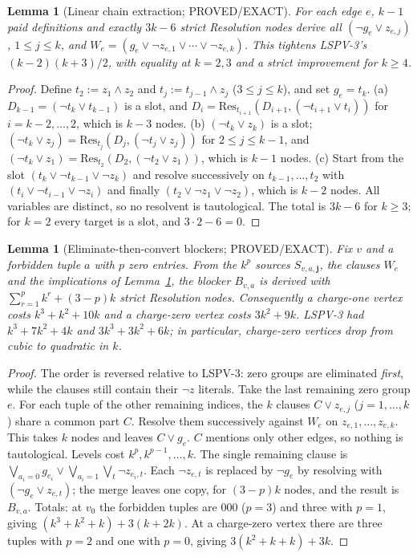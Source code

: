 \documentclass[11pt]{article}
\newtheorem{lemma}[theorem]{Lemma}
\begin{document}
\begin{lemma}[Linear chain extraction; PROVED/EXACT]\label{lem:chain}
For each edge $e$, $k-1$ paid definitions and exactly $3k-6$ strict Resolution nodes derive all $(\neg g_e\vee z_{e,j})$, $1\le j\le k$, and $W_e=(g_e\vee\neg z_{e,1}\vee\cdots\vee\neg z_{e,k})$. This tightens LSPV-3's $(k-2)(k+3)/2$, with equality at $k=2,3$ and a strict improvement for $k\ge4$.
\end{lemma}
\begin{proof}
Define $t_2:=z_1\wedge z_2$ and $t_j:=t_{j-1}\wedge z_j$ ($3\le j\le k$), and set $g_e=t_k$. (a) $D_{k-1}=(\neg t_k\vee t_{k-1})$ is a slot, and $D_i=\mathrm{Res}_{t_{i+1}}(D_{i+1},(\neg t_{i+1}\vee t_i))$ for $i=k-2,\ldots,2$, which is $k-3$ nodes. (b) $(\neg t_k\vee z_k)$ is a slot; $(\neg t_k\vee z_j)=\mathrm{Res}_{t_j}(D_j,(\neg t_j\vee z_j))$ for $2\le j\le k-1$, and $(\neg t_k\vee z_1)=\mathrm{Res}_{t_2}(D_2,(\neg t_2\vee z_1))$, which is $k-1$ nodes. (c) Start from the slot $(t_k\vee\neg t_{k-1}\vee\neg z_k)$ and resolve successively on $t_{k-1},\ldots,t_2$ with $(t_i\vee\neg t_{i-1}\vee\neg z_i)$ and finally $(t_2\vee\neg z_1\vee\neg z_2)$, which is $k-2$ nodes. All variables are distinct, so no resolvent is tautological. The total is $3k-6$ for $k\ge3$; for $k=2$ every target is a slot, and $3\cdot2-6=0$.
\end{proof}

\begin{lemma}[Eliminate-then-convert blockers; PROVED/EXACT]\label{lem:block}
Fix $v$ and a forbidden tuple $a$ with $p$ zero entries. From the $k^p$ sources $S_{v,a,\mathbf j}$, the clauses $W_e$ and the implications of Lemma~\ref{lem:chain}, the blocker $B_{v,a}$ is derived with $\sum_{r=1}^{p}k^r+(3-p)k$ strict Resolution nodes. Consequently a charge-one vertex costs $k^3+k^2+10k$ and a charge-zero vertex costs $3k^2+9k$. LSPV-3 had $k^3+7k^2+4k$ and $3k^3+3k^2+6k$; in particular, charge-zero vertices drop from cubic to quadratic in $k$.
\end{lemma}
\begin{proof}
The order is reversed relative to LSPV-3: zero groups are eliminated \emph{first}, while the clauses still contain their $\neg z$ literals. Take the last remaining zero group $e$. For each tuple of the other remaining indices, the $k$ clauses $C\vee z_{e,j}$ ($j=1,\ldots,k$) share a common part $C$. Resolve them successively against $W_e$ on $z_{e,1},\ldots,z_{e,k}$. This takes $k$ nodes and leaves $C\vee g_e$. $C$ mentions only other edges, so nothing is tautological. Levels cost $k^p,k^{p-1},\ldots,k$. The single remaining clause is $\bigvee_{a_i=0}g_{e_i}\vee\bigvee_{a_i=1}\bigvee_t\neg z_{e_i,t}$. Each $\neg z_{e,t}$ is replaced by $\neg g_e$ by resolving with $(\neg g_e\vee z_{e,t})$; the merge leaves one copy, for $(3-p)k$ nodes, and the result is $B_{v,a}$. Totals: at $v_0$ the forbidden tuples are $000$ ($p=3$) and three with $p=1$, giving $(k^3+k^2+k)+3(k+2k)$. At a charge-zero vertex there are three tuples with $p=2$ and one with $p=0$, giving $3(k^2+k+k)+3k$.
\end{proof}
\end{document}
